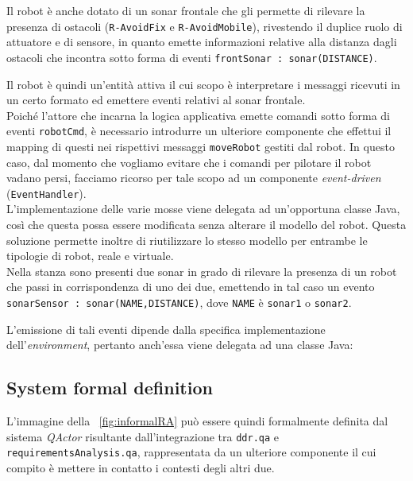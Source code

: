 \documentclass{../llncs}
\newcommand{\codescript}[1]{{\mbox{\small{\texttt{#1}}}}\xspace}
\newcommand{\code}[1]{{\color{blue}\small{\texttt{#1}}}}
\newcommand{\qa}{\textsf{\textit{QActor}}\xspace}
\newcommand{\labelssec}[1]{\label{ssec:#1}}
\newcommand{\xf}[1]{\figurename~\ref{fig:#1}}
\begin{document}
Il robot è anche dotato di un sonar frontale che gli permette di rilevare la presenza di ostacoli (\code{R-AvoidFix} e \code{R-AvoidMobile}), rivestendo il duplice ruolo di attuatore e di sensore, in quanto emette informazioni relative alla distanza dagli ostacoli che incontra sotto forma di eventi \codescript{frontSonar : sonar(DISTANCE)}.

Il robot è quindi un'entità attiva il cui scopo è interpretare i messaggi ricevuti in un certo formato ed emettere eventi relativi al sonar frontale.\\

Poiché l'attore che incarna la logica applicativa emette comandi sotto forma di eventi \codescript{robotCmd}, è necessario introdurre un ulteriore componente che effettui il mapping di questi nei rispettivi messaggi \codescript{moveRobot} gestiti dal robot. In questo caso, dal momento che vogliamo evitare che i comandi per pilotare il robot vadano persi, facciamo ricorso per tale scopo ad un componente \emph{event-driven} (\texttt{EventHandler}).\\



L'implementazione delle varie mosse viene delegata ad un'opportuna classe Java, così che questa possa essere modificata senza alterare il modello del robot. Questa soluzione permette inoltre di riutilizzare lo stesso modello per entrambe le tipologie di robot, reale e virtuale.\\

Nella stanza sono presenti due sonar in grado di rilevare la presenza di un robot che passi in corrispondenza di uno dei due, emettendo in tal caso un evento \codescript{sonarSensor : sonar(NAME,DISTANCE)}, dove \codescript{NAME} è \code{sonar1} o \code{sonar2}.

L'emissione di tali eventi dipende dalla specifica implementazione dell'\textit{environment}, pertanto anch'essa viene delegata ad una classe Java:\\



\subsection{System formal definition}
\labelssec{formalRA}
L'immagine della \xf{informalRA} può essere quindi formalmente definita dal sistema {\qa} risultante dall'integrazione tra \codescript{ddr.qa} e \codescript{requirementsAnalysis.qa}, rappresentata da un ulteriore componente il cui compito è mettere in contatto i contesti degli altri due.\\
\end{document}
